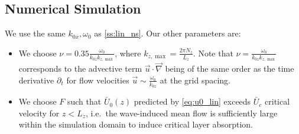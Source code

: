 \documentclass[twocolumn,
        nofootinbib,
        usenames, %
        dvipsnames %
    ]{revtex4-1}%
\begin{document}
\subsection{Numerical Simulation}

We use the same $k_{0x}, \omega_0$ as \autoref{ss:lin_ns}. Our other parameters
are:
\begin{itemize}
    \item We choose $\nu = 0.35 \frac{\omega_0}{k_{0z}k_{z, \max}}$, where
        $k_{z, \max} = \frac{2\pi N_z}{L_z}$. Note that $\nu =
        \frac{\omega_0}{k_{0z} k_{z, \max}}$ corresponds to the advective term
        $\vec{u} \cdot \vec{\nabla}$ being of the same order as the time
        derivative $\partial_t$ for flow velocities $\vec{u} \sim
        \frac{\omega_0}{k_{0z}}$ at the grid spacing.

    \item We choose $F$ such that $\bar{U}_0(z)$ predicted by
        \autoref{eq:u0_lin} exceeds $\bar{U}_c$ critical velocity for $z <
        L_z$, i.e.\ the wave-induced mean flow is sufficiently large within the
        simulation domain to induce critical layer absorption.
\end{itemize}
\end{document}

